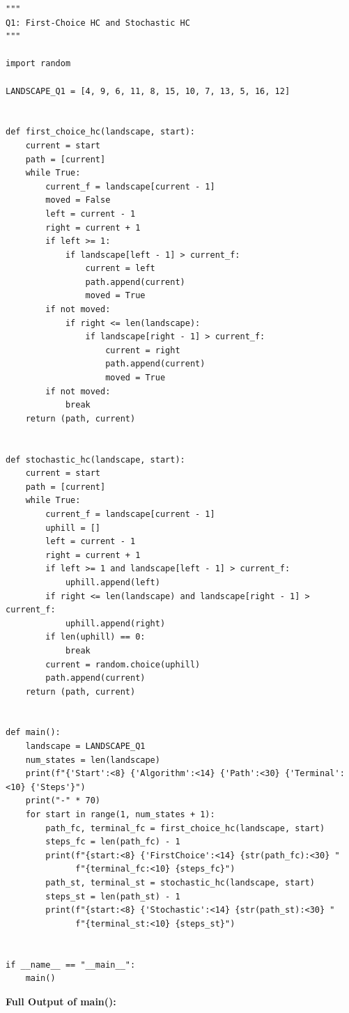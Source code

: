 \documentclass[12pt,a4paper]{article}
\begin{document}
\begin{lstlisting}[style=pycode, caption={Q1: First-Choice and Stochastic Hill Climbing}]
"""
Q1: First-Choice HC and Stochastic HC
"""

import random

LANDSCAPE_Q1 = [4, 9, 6, 11, 8, 15, 10, 7, 13, 5, 16, 12]


def first_choice_hc(landscape, start):
    current = start
    path = [current]
    while True:
        current_f = landscape[current - 1]
        moved = False
        left = current - 1
        right = current + 1
        if left >= 1:
            if landscape[left - 1] > current_f:
                current = left
                path.append(current)
                moved = True
        if not moved:
            if right <= len(landscape):
                if landscape[right - 1] > current_f:
                    current = right
                    path.append(current)
                    moved = True
        if not moved:
            break
    return (path, current)


def stochastic_hc(landscape, start):
    current = start
    path = [current]
    while True:
        current_f = landscape[current - 1]
        uphill = []
        left = current - 1
        right = current + 1
        if left >= 1 and landscape[left - 1] > current_f:
            uphill.append(left)
        if right <= len(landscape) and landscape[right - 1] > current_f:
            uphill.append(right)
        if len(uphill) == 0:
            break
        current = random.choice(uphill)
        path.append(current)
    return (path, current)


def main():
    landscape = LANDSCAPE_Q1
    num_states = len(landscape)
    print(f"{'Start':<8} {'Algorithm':<14} {'Path':<30} {'Terminal':<10} {'Steps'}")
    print("-" * 70)
    for start in range(1, num_states + 1):
        path_fc, terminal_fc = first_choice_hc(landscape, start)
        steps_fc = len(path_fc) - 1
        print(f"{start:<8} {'FirstChoice':<14} {str(path_fc):<30} "
              f"{terminal_fc:<10} {steps_fc}")
        path_st, terminal_st = stochastic_hc(landscape, start)
        steps_st = len(path_st) - 1
        print(f"{start:<8} {'Stochastic':<14} {str(path_st):<30} "
              f"{terminal_st:<10} {steps_st}")


if __name__ == "__main__":
    main()
\end{lstlisting}

\textbf{Full Output of main():}
\end{document}
